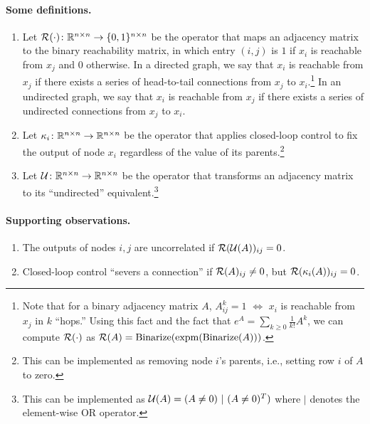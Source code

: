 \paragraph{Some definitions.}
\begin{enumerate}
    \item Let $\mathcal{R}(\cdot) \colon \mathbb{R}^{n \times n} \to \{0,1\}^{n \times n}$ be the operator that maps an adjacency matrix to the binary reachability matrix, in which entry $(i,j)$ is $1$ if $x_i$ is reachable from $x_j$ and $0$ otherwise. In a directed graph, we say that $x_i$ is reachable from $x_j$ if there exists a series of head-to-tail connections from $x_j$ to $x_i$.\footnote{Note that for a binary adjacency matrix $A$, $A^k_{ij} = 1$ $\iff$ $x_i$ is reachable from $x_j$ in $k$ ``hops.'' Using this fact and the fact that $e^A = \sum_{k \geq 0} \tfrac{1}{k!} A^k$, we can compute $\mathcal{R}(\cdot)$ as $\mathcal{R}(A) = \mathrm{Binarize}(\mathrm{expm}(\mathrm{Binarize}(A)))$.} In an undirected graph, we say that $x_i$ is reachable from $x_j$ if there exists a series of undirected connections from $x_j$ to $x_i$.
    \item Let $\kappa_i \colon \mathbb{R}^{n \times n} \to \mathbb{R}^{n \times n}$ be the operator that applies closed-loop control to fix the output of node $x_i$ regardless of the value of its parents.\footnote{This can be implemented as removing node $i$'s parents, i.e., setting row $i$ of $A$ to zero.}
    \item Let $\mathcal{U} \colon \mathbb{R}^{n \times n} \to \mathbb{R}^{n \times n}$ be the operator that transforms an adjacency matrix to its ``undirected'' equivalent.\footnote{This can be implemented as $\mathcal{U}(A) = (A \neq 0) ~\vert~ (A \neq 0)^T)$ where $\vert$ denotes the element-wise OR operator.}
\end{enumerate}

\paragraph{Supporting observations.}
\begin{enumerate}
    \item The outputs of nodes $i,j$ are uncorrelated if $\mathcal{R}(\mathcal{U}(A))_{ij} = 0$.
    \item Closed-loop control ``severs a connection'' if $\mathcal{R}(A)_{ij} \neq 0$, but $\mathcal{R}(\kappa_i(A))_{ij} = 0$.
\end{enumerate}

